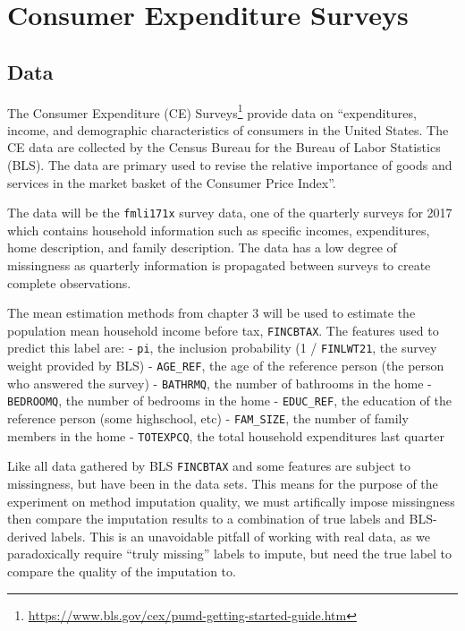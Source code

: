 \documentclass[12pt,twoside]{reedthesis}
\begin{document}
\chapter{Consumer Expenditure
Surveys}\label{consumer-expenditure-surveys}

\section{Data}\label{data}

The Consumer Expenditure (CE) Surveys\footnote{\url{https://www.bls.gov/cex/pumd-getting-started-guide.htm}}
provide data on ``expenditures, income, and demographic characteristics
of consumers in the United States. The CE data are collected by the
Census Bureau for the Bureau of Labor Statistics (BLS). The data are
primary used to revise the relative importance of goods and services in
the market basket of the Consumer Price Index''.

The data will be the \texttt{fmli171x} survey data, one of the quarterly
surveys for 2017 which contains household information such as specific
incomes, expenditures, home description, and family description. The
data has a low degree of missingness as quarterly information is
propagated between surveys to create complete observations.

The mean estimation methods from chapter 3 will be used to estimate the
population mean household income before tax, \texttt{FINCBTAX}. The
features used to predict this label are: - \texttt{pi}, the inclusion
probability (1 / \texttt{FINLWT21}, the survey weight provided by BLS) -
\texttt{AGE\_REF}, the age of the reference person (the person who
answered the survey) - \texttt{BATHRMQ}, the number of bathrooms in the
home - \texttt{BEDROOMQ}, the number of bedrooms in the home -
\texttt{EDUC\_REF}, the education of the reference person (some
highschool, etc) - \texttt{FAM\_SIZE}, the number of family members in
the home - \texttt{TOTEXPCQ}, the total household expenditures last
quarter

Like all data gathered by BLS \texttt{FINCBTAX} and some features are
subject to missingness, but have been in the data sets. This means for
the purpose of the experiment on method imputation quality, we must
artifically impose missingness then compare the imputation results to a
combination of true labels and BLS-derived labels. This is an
unavoidable pitfall of working with real data, as we paradoxically
require ``truly missing'' labels to impute, but need the true label to
compare the quality of the imputation to.
\end{document}

